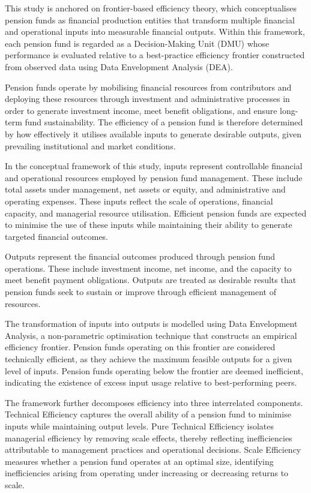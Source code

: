 \documentclass[12pt,a4paper]{article}
\begin{document}
This study is anchored on frontier-based efficiency theory, which conceptualises pension funds as financial production entities that transform multiple financial and operational inputs into measurable financial outputs. Within this framework, each pension fund is regarded as a Decision-Making Unit (DMU) whose performance is evaluated relative to a best-practice efficiency frontier constructed from observed data using Data Envelopment Analysis (DEA).

Pension funds operate by mobilising financial resources from contributors and deploying these resources through investment and administrative processes in order to generate investment income, meet benefit obligations, and ensure long-term fund sustainability. The efficiency of a pension fund is therefore determined by how effectively it utilises available inputs to generate desirable outputs, given prevailing institutional and market conditions.

In the conceptual framework of this study, inputs represent controllable financial and operational resources employed by pension fund management. These include total assets under management, net assets or equity, and administrative and operating expenses. These inputs reflect the scale of operations, financial capacity, and managerial resource utilisation. Efficient pension funds are expected to minimise the use of these inputs while maintaining their ability to generate targeted financial outcomes.

Outputs represent the financial outcomes produced through pension fund operations. These include investment income, net income, and the capacity to meet benefit payment obligations. Outputs are treated as desirable results that pension funds seek to sustain or improve through efficient management of resources.

The transformation of inputs into outputs is modelled using Data Envelopment Analysis, a non-parametric optimisation technique that constructs an empirical efficiency frontier. Pension funds operating on this frontier are considered technically efficient, as they achieve the maximum feasible outputs for a given level of inputs. Pension funds operating below the frontier are deemed inefficient, indicating the existence of excess input usage relative to best-performing peers.

The framework further decomposes efficiency into three interrelated components. Technical Efficiency captures the overall ability of a pension fund to minimise inputs while maintaining output levels. Pure Technical Efficiency isolates managerial efficiency by removing scale effects, thereby reflecting inefficiencies attributable to management practices and operational decisions. Scale Efficiency measures whether a pension fund operates at an optimal size, identifying inefficiencies arising from operating under increasing or decreasing returns to scale.
\end{document}
